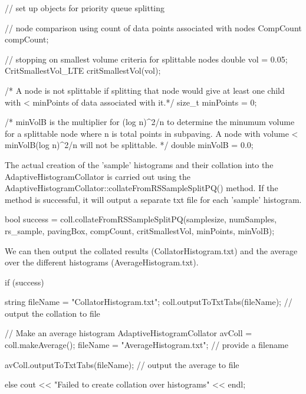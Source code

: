 \begin{DoxyCodeInclude}
    // set up objects for priority queue splitting

    // node comparison using count of data points associated with nodes
    CompCount compCount;

    // stopping on smallest volume criteria for splittable nodes
    double vol = 0.05;
    CritSmallestVol_LTE critSmallestVol(vol);

    /* A node is not splittable if splitting that node would give at least
    one child with < minPoints of data associated with it.*/
    size_t minPoints = 0;

    /* minVolB is the multiplier for (log n)^2/n to determine the minumum
    volume for a splittable node where n is total points in subpaving.
    A node with volume < minVolB(log n)^2/n will not be splittable. */
    double minVolB = 0.0;

\end{DoxyCodeInclude}


\-The actual creation of the 'sample' histograms and their collation into the \-Adaptive\-Histogram\-Collator is carried out using the \-Adaptive\-Histogram\-Collator\-::collate\-From\-R\-S\-Sample\-Split\-P\-Q() method. \-If the method is successful, it will output a separate txt file for each 'sample' histogram.


\begin{DoxyCodeInclude}
    bool success = coll.collateFromRSSampleSplitPQ(samplesize, numSamples,
                    rs_sample, pavingBox, compCount,
                    critSmallestVol, minPoints, minVolB);

\end{DoxyCodeInclude}


\-We can then output the collated results (\-Collator\-Histogram.\-txt) and the average over the different histograms (\-Average\-Histogram.\-txt).


\begin{DoxyCodeInclude}
    if (success) {
    string fileName = "CollatorHistogram.txt";
    coll.outputToTxtTabs(fileName); // output the collation to file

    //  Make an average histogram
    AdaptiveHistogramCollator avColl = coll.makeAverage();
    fileName = "AverageHistogram.txt";     // provide a filename

    avColl.outputToTxtTabs(fileName);  // output the average to file
    }

    else    cout << "Failed to create collation over histograms" << endl;

\end{DoxyCodeInclude}


